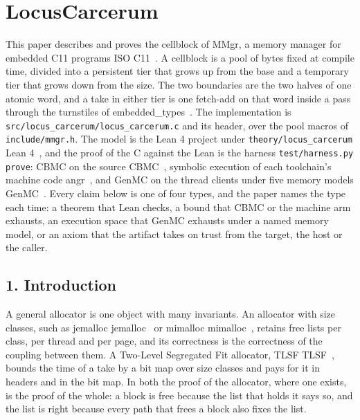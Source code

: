 \chapter{\texorpdfstring{LocusCarcerum}{LocusCarcerum}}
\label{chap:locus-carcerum}

This paper describes and proves the cellblock of MMgr, a memory manager for embedded C11 programs ISO C11~\cite{src:ISO-C11}. A cellblock is a pool of bytes fixed at compile time, divided into a persistent tier that grows up from the base and a temporary tier that grows down from the size. The two boundaries are the two halves of one atomic word, and a take in either tier is one fetch-add on that word inside a pass through the turnstiles of embedded\_\allowbreak{}types~\cite{src:Turnstile}. The implementation is \texttt{src/\allowbreak{}locus\_\allowbreak{}carcerum/\allowbreak{}locus\_\allowbreak{}carcerum.\allowbreak{}c} and its header, over the pool macros of \texttt{include/\allowbreak{}mmgr.\allowbreak{}h}. The model is the Lean 4 project under \texttt{theory/\allowbreak{}locus\_\allowbreak{}carcerum} Lean 4~\cite{src:Lean4}, and the proof of the C against the Lean is the harness \texttt{test/\allowbreak{}harness.\allowbreak{}py prove}: CBMC on the source CBMC~\cite{src:CBMC}, symbolic execution of each toolchain's machine code angr~\cite{src:angr}, and GenMC on the thread clients under five memory models GenMC~\cite{src:GenMC}. Every claim below is one of four types, and the paper names the type each time: a theorem that Lean checks, a bound that CBMC or the machine arm exhausts, an execution space that GenMC exhausts under a named memory model, or an axiom that the artifact takes on trust from the target, the host or the caller.

\section{\texorpdfstring{1. Introduction}{1. Introduction}}

A general allocator is one object with many invariants. An allocator with size classes, such as jemalloc jemalloc~\cite{src:jemalloc} or mimalloc mimalloc~\cite{src:mimalloc}, retains free lists per class, per thread and per page, and its correctness is the correctness of the coupling between them. A Two-Level Segregated Fit allocator, TLSF TLSF~\cite{src:TLSF}, bounds the time of a take by a bit map over size classes and pays for it in headers and in the bit map. In both the proof of the allocator, where one exists, is the proof of the whole: a block is free because the list that holds it says so, and the list is right because every path that frees a block also fixes the list.

